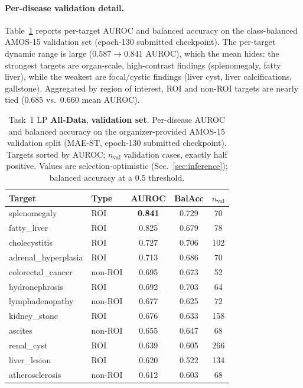 \documentclass[runningheads]{llncs}
\begin{document}
\paragraph{Per-disease validation detail.}
Table~\ref{tab:results-lp} reports per-target AUROC and balanced accuracy on the
class-balanced AMOS-15 validation set (epoch-130 submitted checkpoint). The
per-target dynamic range is large ($0.587\!\to\!0.841$ AUROC), which the mean
hides: the strongest targets are organ-scale, high-contrast findings
(splenomegaly, fatty liver), while the weakest are focal/cystic findings
(liver cyst, liver calcifications, gallstone). Aggregated by region of interest,
ROI and non-ROI targets are nearly tied ($0.685$ vs.\ $0.660$ mean AUROC).

\begin{table}[htbp]
\caption{Task~1 LP \textbf{All-Data}, \textbf{validation set}. Per-disease AUROC
and balanced accuracy on the organizer-provided AMOS-15 validation split
(MAE-ST, epoch-130 submitted checkpoint). Targets sorted by AUROC; $n_\text{val}$
validation cases, exactly half positive. Values are selection-optimistic
(Sec.~\ref{sec:inference}); balanced accuracy at a $0.5$ threshold.}
\label{tab:results-lp}
\centering
\begin{tabular}{llccc}
\hline
Target & Type & AUROC & BalAcc & $n_\text{val}$ \\ \hline
splenomegaly         & ROI     & \textbf{0.841} & 0.729 & 70  \\ \hline
fatty\_liver          & ROI     & 0.825 & 0.679 & 78  \\ \hline
cholecystitis        & ROI     & 0.727 & 0.706 & 102 \\ \hline
adrenal\_hyperplasia  & ROI     & 0.713 & 0.686 & 70  \\ \hline
colorectal\_cancer    & non-ROI & 0.695 & 0.673 & 52  \\ \hline
hydronephrosis       & ROI     & 0.692 & 0.703 & 64  \\ \hline
lymphadenopathy      & non-ROI & 0.677 & 0.625 & 72  \\ \hline
kidney\_stone         & ROI     & 0.676 & 0.633 & 158 \\ \hline
ascites              & non-ROI & 0.655 & 0.647 & 68  \\ \hline
renal\_cyst           & ROI     & 0.639 & 0.605 & 266 \\ \hline
liver\_lesion         & ROI     & 0.620 & 0.522 & 134 \\ \hline
atherosclerosis      & non-ROI & 0.612 & 0.603 & 68  \\ \hline

\end{tabular}
\end{table}
\end{document}
